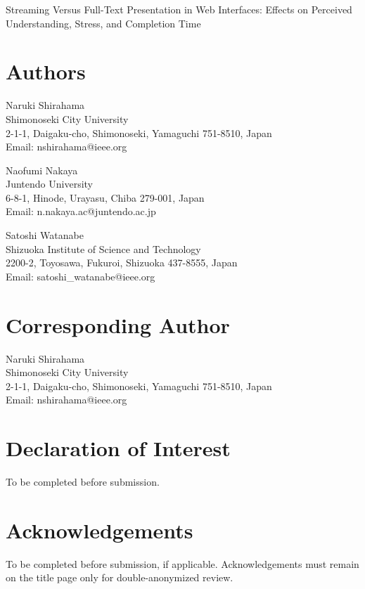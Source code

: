 \documentclass{article}
\begin{document}
\begin{center}
{\Large Streaming Versus Full-Text Presentation in Web Interfaces: Effects on Perceived Understanding, Stress, and Completion Time}
\end{center}

\section*{Authors}

Naruki Shirahama\\
Shimonoseki City University\\
2-1-1, Daigaku-cho, Shimonoseki, Yamaguchi 751-8510, Japan\\
Email: nshirahama@ieee.org

\vspace{1em}

Naofumi Nakaya\\
Juntendo University\\
6-8-1, Hinode, Urayasu, Chiba 279-001, Japan\\
Email: n.nakaya.ac@juntendo.ac.jp

\vspace{1em}

Satoshi Watanabe\\
Shizuoka Institute of Science and Technology\\
2200-2, Toyosawa, Fukuroi, Shizuoka 437-8555, Japan\\
Email: satoshi\_watanabe@ieee.org

\section*{Corresponding Author}

Naruki Shirahama\\
Shimonoseki City University\\
2-1-1, Daigaku-cho, Shimonoseki, Yamaguchi 751-8510, Japan\\
Email: nshirahama@ieee.org

\section*{Declaration of Interest}

To be completed before submission.

\section*{Acknowledgements}

To be completed before submission, if applicable. Acknowledgements must remain on the title page only for double-anonymized review.
\end{document}
